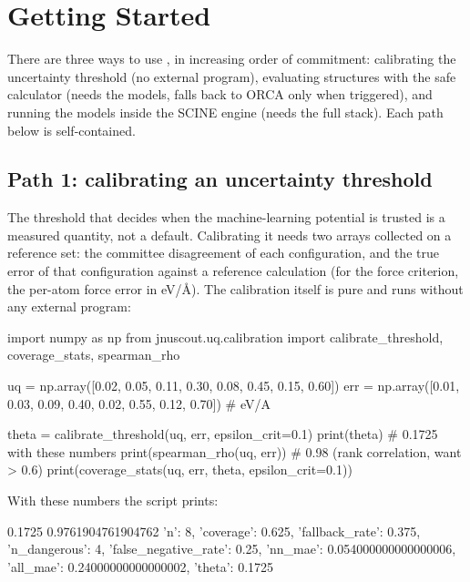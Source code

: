 \chapter{Getting Started}
\label{ch:getting-started}

There are three ways to use \jns{}, in increasing order of commitment:
calibrating the uncertainty threshold (no external program), evaluating
structures with the safe calculator (needs the models, falls back to ORCA
only when triggered), and running the models inside the SCINE engine (needs
the full stack).  Each path below is self-contained.

\section{Path 1: calibrating an uncertainty threshold}

The threshold that decides when the machine-learning potential is trusted is
a measured quantity, not a default.  Calibrating it needs two arrays
collected on a reference set: the committee disagreement  of each
configuration, and the true error  of that configuration against a
reference calculation (for the force criterion, the per-atom force error in
eV/\AA).  The calibration itself is pure  and runs without any
external program:

\begin{codeblock}
import numpy as np
from jnuscout.uq.calibration import calibrate_threshold, coverage_stats, spearman_rho

uq  = np.array([0.02, 0.05, 0.11, 0.30, 0.08, 0.45, 0.15, 0.60])
err = np.array([0.01, 0.03, 0.09, 0.40, 0.02, 0.55, 0.12, 0.70])  # eV/A

theta = calibrate_threshold(uq, err, epsilon_crit=0.1)
print(theta)                             # 0.1725 with these numbers
print(spearman_rho(uq, err))             # 0.98 (rank correlation, want > 0.6)
print(coverage_stats(uq, err, theta, epsilon_crit=0.1))
\end{codeblock}

With these numbers the script prints:

\begin{transcript}
0.1725
0.9761904761904762
{'n': 8, 'coverage': 0.625, 'fallback_rate': 0.375, 'n_dangerous': 4,
 'false_negative_rate': 0.25, 'nn_mae': 0.054000000000000006,
 'all_mae': 0.24000000000000002, 'theta': 0.1725}
\end{transcript}

